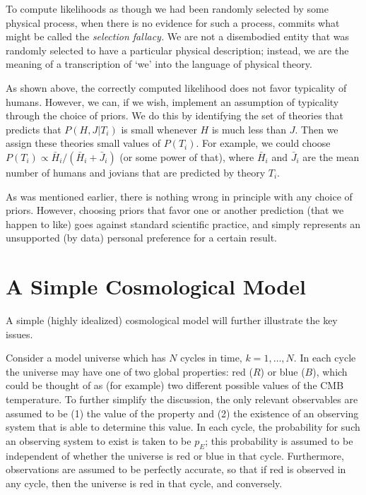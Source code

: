 \documentclass[pra,twocolumn,nofootinbib,eqsecnum,floatfix]{revtex4}
\begin{document}
To compute likelihoods as though we had been randomly selected by some physical process, when there is no evidence for such a process, commits what might be called the
{\it selection fallacy.}  We are not a disembodied entity that was randomly selected to have a particular physical description; instead, we are the meaning of a transcription of `we' 
into the language of physical theory. 

As shown above, the correctly computed likelihood does not favor typicality of humans.
However, we can, if we wish, implement an assumption of typicality through the choice
of priors.  We do this by identifying the set of theories that predicts that $P(H,J|T_i)$ 
is small whenever $H$ is much less than $J$.   Then we assign these theories small values of $P(T_i)$.  For example, we could choose $P(T_i) \propto {\bar H}_i/({\bar H}_i+{\bar J}_i)$ 
(or some power of that), where $\bar H_i$ and $\bar J_i$ are the mean number of 
humans and jovians that are predicted by theory $T_i$. 

As was mentioned earlier, there is nothing wrong in principle with any choice of priors.  However,
choosing priors that favor one or another prediction (that we happen to like) goes against standard scientific practice, and simply represents an unsupported (by data) personal preference for a
certain result.   

\section{A Simple Cosmological Model}  

A simple (highly idealized) cosmological model will further illustrate the key issues. 

Consider a model universe which has $N$ cycles in time, $k=1, \ldots, N$. In each cycle the universe may have one of two global properties: red ($R$) or blue ($B$), which could be 
thought of as (for example) two different possible values of the CMB temperature.   To further simplify the discussion, the only relevant observables are assumed to be (1) the value of the property and (2) the existence of an observing system that is able 
to determine this value. 
In each cycle, the probability for such an observing system to exist is taken to be $p_E$; this probability is assumed to be independent of whether the universe is red or blue in that cycle. Furthermore, observations are assumed to be perfectly accurate, so that if red is observed in any cycle, then the universe is red in that cycle, and conversely.
\end{document}
